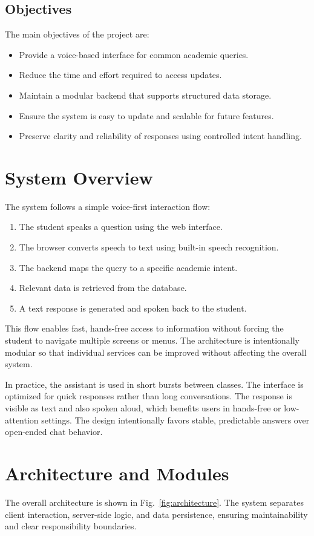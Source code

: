 ﻿\documentclass[conference]{IEEEtran}
\begin{document}
\subsection{Objectives}
The main objectives of the project are:
\begin{itemize}[leftmargin=*]
\item Provide a voice-based interface for common academic queries.
\item Reduce the time and effort required to access updates.
\item Maintain a modular backend that supports structured data storage.
\item Ensure the system is easy to update and scalable for future features.
\item Preserve clarity and reliability of responses using controlled intent handling.
\end{itemize}

\section{System Overview}
The system follows a simple voice-first interaction flow:
\begin{enumerate}[leftmargin=*]
\item The student speaks a question using the web interface.
\item The browser converts speech to text using built-in speech recognition.
\item The backend maps the query to a specific academic intent.
\item Relevant data is retrieved from the database.
\item A text response is generated and spoken back to the student.
\end{enumerate}

This flow enables fast, hands-free access to information without forcing the student to navigate multiple screens or menus. The architecture is intentionally modular so that individual services can be improved without affecting the overall system.

In practice, the assistant is used in short bursts between classes. The interface is optimized for quick responses rather than long conversations. The response is visible as text and also spoken aloud, which benefits users in hands-free or low-attention settings. The design intentionally favors stable, predictable answers over open-ended chat behavior.

\section{Architecture and Modules}
The overall architecture is shown in Fig.~\ref{fig:architecture}. The system separates client interaction, server-side logic, and data persistence, ensuring maintainability and clear responsibility boundaries.
\end{document}
